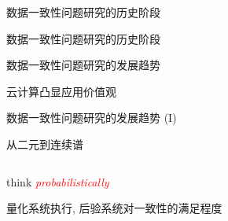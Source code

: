 \begin{frame}{数据一致性问题研究的历史阶段}

\end{frame}
\begin{frame}{数据一致性问题研究的历史阶段}
\end{frame}
\begin{frame}{数据一致性问题研究的发展趋势}
  \begin{center}
	云计算凸显应用价值观
  \end{center}

\end{frame}
\begin{frame}{数据一致性问题研究的发展趋势 (I)}
  \begin{description}
	\setlength{\itemsep}{20pt}
	\item[精细化:] 从二元到连续谱
	  \begin{columns}
	  \end{columns}
	\item[可度量:] think \textcolor{red}{\it probabilistically} 
	  \begin{center}
		量化系统执行, 后验系统对一致性的满足程度
	  \end{center}
  \end{description}
\end{frame}
